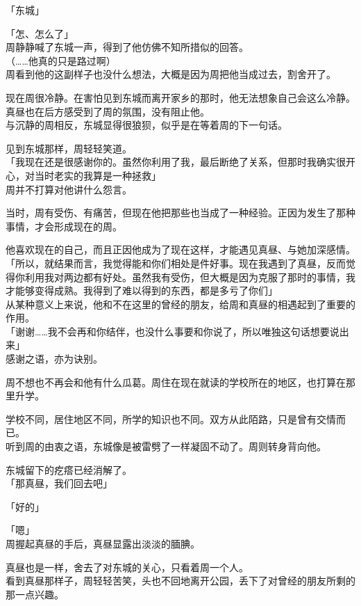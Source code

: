 「东城」

「怎、怎么了」\\

周静静喊了东城一声，得到了他仿佛不知所措似的回答。\\

（……他真的只是路过啊）\\

周看到他的这副样子也没什么想法，大概是因为周把他当成过去，割舍开了。

现在周很冷静。在害怕见到东城而离开家乡的那时，他无法想象自己会这么冷静。真昼也在后方感受到了周的氛围，没有阻止他。\\

与沉静的周相反，东城显得很狼狈，似乎是在等着周的下一句话。

见到东城那样，周轻轻笑道。\\

「我现在还是很感谢你的。虽然你利用了我，最后断绝了关系，但那时我确实很开心，对当时老实的我算是一种拯救」\\

周并不打算对他讲什么怨言。

当时，周有受伤、有痛苦，但现在他把那些也当成了一种经验。正因为发生了那种事情，才会形成现在的周。

他喜欢现在的自己，而且正因他成为了现在这样，才能遇见真昼、与她加深感情。\\

「所以，就结果而言，我觉得能和你们相处是件好事。现在我遇到了真昼，反而觉得你利用我对两边都有好处。虽然我有受伤，但大概是因为克服了那时的事情，我才能够变得成熟。我得到了难以得到的东西，都是多亏了你们」\\

从某种意义上来说，他和不在这里的曾经的朋友，给周和真昼的相遇起到了重要的作用。\\

「谢谢……我不会再和你结伴，也没什么事要和你说了，所以唯独这句话想要说出来」\\

感谢之语，亦为诀别。

周不想也不再会和他有什么瓜葛。周住在现在就读的学校所在的地区，也打算在那里升学。

学校不同，居住地区不同，所学的知识也不同。双方从此陌路，只是曾有交情而已。\\

听到周的由衷之语，东城像是被雷劈了一样凝固不动了。周则转身背向他。

东城留下的疙瘩已经消解了。\\

「那真昼，我们回去吧」

「好的」

「嗯」\\

周握起真昼的手后，真昼显露出淡淡的腼腆。

真昼也是一样，舍去了对东城的关心，只看着周一个人。\\

看到真昼那样子，周轻轻苦笑，头也不回地离开公园，丢下了对曾经的朋友所剩的那一点兴趣。

